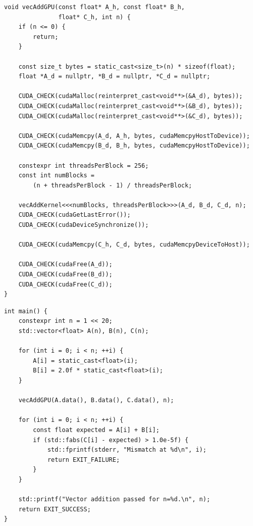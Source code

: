 \par\noindent\begin{minipage}{\linewidth}
\begin{lstlisting}[style=cuda,firstnumber=28]
void vecAddGPU(const float* A_h, const float* B_h,
               float* C_h, int n) {
    if (n <= 0) {
        return;
    }

    const size_t bytes = static_cast<size_t>(n) * sizeof(float);
    float *A_d = nullptr, *B_d = nullptr, *C_d = nullptr;

    CUDA_CHECK(cudaMalloc(reinterpret_cast<void**>(&A_d), bytes));
    CUDA_CHECK(cudaMalloc(reinterpret_cast<void**>(&B_d), bytes));
    CUDA_CHECK(cudaMalloc(reinterpret_cast<void**>(&C_d), bytes));

    CUDA_CHECK(cudaMemcpy(A_d, A_h, bytes, cudaMemcpyHostToDevice));
    CUDA_CHECK(cudaMemcpy(B_d, B_h, bytes, cudaMemcpyHostToDevice));

    constexpr int threadsPerBlock = 256;
    const int numBlocks =
        (n + threadsPerBlock - 1) / threadsPerBlock;

    vecAddKernel<<<numBlocks, threadsPerBlock>>>(A_d, B_d, C_d, n);
    CUDA_CHECK(cudaGetLastError());
    CUDA_CHECK(cudaDeviceSynchronize());

    CUDA_CHECK(cudaMemcpy(C_h, C_d, bytes, cudaMemcpyDeviceToHost));

    CUDA_CHECK(cudaFree(A_d));
    CUDA_CHECK(cudaFree(B_d));
    CUDA_CHECK(cudaFree(C_d));
}
\end{lstlisting}
\end{minipage}\par

\par\noindent\begin{minipage}{\linewidth}
\begin{lstlisting}[style=cuda,firstnumber=59]
int main() {
    constexpr int n = 1 << 20;
    std::vector<float> A(n), B(n), C(n);

    for (int i = 0; i < n; ++i) {
        A[i] = static_cast<float>(i);
        B[i] = 2.0f * static_cast<float>(i);
    }

    vecAddGPU(A.data(), B.data(), C.data(), n);

    for (int i = 0; i < n; ++i) {
        const float expected = A[i] + B[i];
        if (std::fabs(C[i] - expected) > 1.0e-5f) {
            std::fprintf(stderr, "Mismatch at %d\n", i);
            return EXIT_FAILURE;
        }
    }

    std::printf("Vector addition passed for n=%d.\n", n);
    return EXIT_SUCCESS;
}
\end{lstlisting}
\end{minipage}\par

